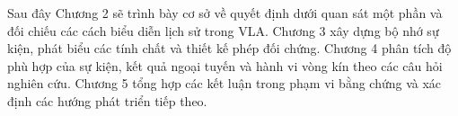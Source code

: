 Sau đây Chương 2 sẽ trình bày cơ sở về quyết định dưới quan sát một phần và đối chiếu các cách biểu diễn lịch sử trong VLA. Chương 3 xây dựng bộ nhớ sự kiện, phát biểu các tính chất và thiết kế phép đối chứng. Chương 4 phân tích độ phù hợp của sự kiện, kết quả ngoại tuyến và hành vi vòng kín theo các câu hỏi nghiên cứu. Chương 5 tổng hợp các kết luận trong phạm vi bằng chứng và xác định các hướng phát triển tiếp theo.
